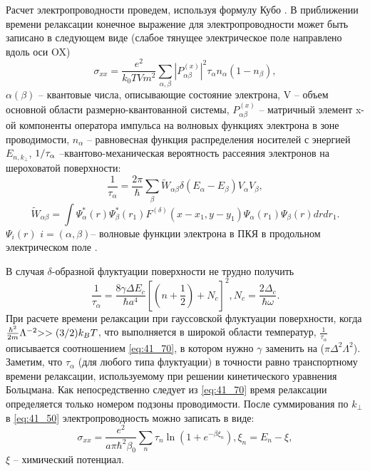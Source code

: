 Расчет электропроводности проведем, используя формулу Кубо \cite{Kubo1957a}. В приближении времени релаксации \cite{Khamidullin2002} конечное выражение для электропроводности может быть записано в следующем виде (слабое тянущее электрическое поле направлено вдоль оси OX)
\begin{equation} \label{eq:41_50}
\sigma _{xx} =\frac{e^{2} }{k_{0} TVm^{2} } \sum _{\alpha ,\beta }\left|P_{\alpha \beta }^{\left(x\right)} \right|^{2} \tau _{\alpha } n_{\alpha } \left(1-n_{\beta } \right) ,
\end{equation} 
$\alpha (\beta )$ -- квантовые числа, описывающие состояние электрона, V -- объем основной области размерно-квантованной системы, $P_{\alpha \beta }^{\left(x\right)} $ -- матричный элемент x-ой компоненты оператора импульса на волновых функциях электрона в зоне проводимости, $n_{\alpha } $ -- равновесная функция распределения носителей с энергией $E_{n,k_{\bot } } $, ${1 \mathord{\left/{\vphantom{1 \tau _{\alpha } }}\right.\kern-\nulldelimiterspace} \tau _{\alpha } } $ --квантово-механическая вероятность рассеяния электронов на шероховатой поверхности:
\begin{equation} \label{eq:41_60}
\frac{1}{\tau _{\alpha } } =\frac{2\pi }{\hbar } \sum _{\beta }\tilde{W}_{\alpha \beta } \delta \left(E_{\alpha } -E_{\beta } \right) V_{\alpha } V_{\beta } ,
\end{equation}  
\[
\tilde{W}_{\alpha \beta } =\int \Psi _{\alpha }^{*} \left(r\right)\Psi _{\beta }^{*} \left(r_{1} \right)F^{(\delta )} \left(x-x_{1} ,y-y_{1} \right)\Psi _{\alpha } \left(r_{1} \right)\Psi _{\beta } \left(r\right)drdr_{1}  .
\] 
$\Psi _{i} \left(r\right)$ $i=(\alpha ,\beta )$-- волновые функции электрона в ПКЯ в продольном электрическом поле \cite{Sinyavskii1998}.

В случая $\delta $-образной флуктуации поверхности не трудно получить
\begin{equation} \label{eq:41_70}
\frac{1}{\tau _{\alpha } } =\frac{8\gamma \Delta E_{c} }{\hbar a^{4} } \left[\left(n+\frac{1}{2} \right)+N_{c} \right]^{2} , N_{c} =\frac{2\Delta _{c} }{\hbar \omega } .
\end{equation}  
При расчете времени релаксации при гауссовской флуктуации поверхности, когда $\frac{\hbar ^{2} }{2m} \Lambda ^{-2} {>>(3 \mathord{\left/{\vphantom{>>(3 2}}\right.\kern-\nulldelimiterspace} 2} )k_{B} T$, что выполняется в широкой области температур, $\frac{1}{\tau _{\alpha } } $ описывается соотношением \eqref{eq:41_70}, в котором нужно $\gamma $ заменить на ($\pi \Delta ^{2} \Lambda ^{2} $). Заметим, что $\tau _{\alpha } $ (для любого типа флуктуации) в точности равно транспортному времени релаксации, используемому при решении кинетического уравнения Больцмана. Как непосредственно следует из \eqref{eq:41_70} время релаксации определяется только номером подзоны проводимости. После суммирования по $k_{\bot } $ в \eqref{eq:41_50} электропроводность можно записать в виде:
\begin{equation} \label{eq:41_80}
\sigma _{xx} =\frac{e^{2} }{a\pi \hbar ^{2} \beta _{0} } \sum _{n}\tau _{n} \ln \left(1+e^{-\beta \xi _{n} } \right) , \xi _{n} =E_{n} -\xi ,
\end{equation}
$\xi $ -- химический потенциал.


